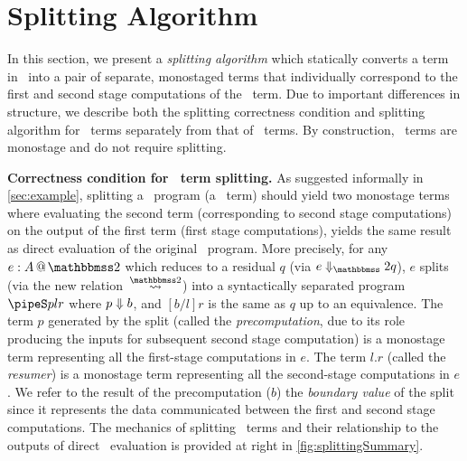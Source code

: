 
\section{Splitting Algorithm}
\label{sec:splitting}



\begin{abstrsyn}


In this section, we present a \emph{splitting algorithm} which
statically converts a term in \lang\ into a pair of separate,
monostaged terms that individually correspond to the first and second
stage computations of the \lang\ term. Due to important differences in
structure, we describe both the splitting correctness condition and
splitting algorithm for \bbonem\ terms separately from that of
\bbtwo\ terms.  By construction, \bbonep\ terms are monostage and do
not require splitting.

\textbf{Correctness condition for \bbtwo\ term splitting.}  As
suggested informally in \ref{sec:example}, splitting a \lang\ program
(a \bbtwo\ term) should yield two monostage terms where evaluating the
second term (corresponding to second stage computations) on the output
of the first term (first stage computations), yields the same result
as direct evaluation of the original \lang\ program.  More precisely,
for any $\coltwo e A$ which reduces to a residual $q$ (via $\diatwo e
q$), $e$ splits (via the new relation~$\splittwosym$) into a
syntactically separated program $\pipeS p l r$ where ${p} \Downarrow {b}$,
and $[b/l]r$ is the same as $q$ up to an equivalence. The term $p$
generated by the split (called the {\em precomputation}, due to its
role producing the inputs for subsequent second stage computation) is
a monostage term representing all the first-stage computations in
$e$. The term $l.r$ (called the {\em resumer}) is a monostage term
representing all the second-stage computations in $e$.  We refer to
the result of the precomputation ($b$) the {\em boundary value} of the
split since it represents the data communicated between the first and
second stage computations.  The mechanics of splitting \bbtwo\ terms
and their relationship to the outputs of direct \lang\ evaluation is
provided at right in \ref{fig:splittingSummary}.



\end{abstrsyn}
